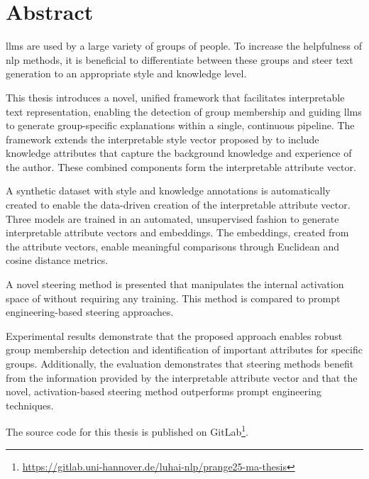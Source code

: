 %
\chapter*{Abstract}%
\label{sec:abstract}
\vspace*{-10mm}

\Acp{llm} are used by a large variety of groups of people. To increase the helpfulness of \ac{nlp} methods, it is beneficial to differentiate between these groups and steer text generation to an appropriate style and knowledge level.

This thesis introduces a novel, unified framework that facilitates interpretable text representation, enabling the detection of group membership and guiding \acp{llm} to generate group-specific explanations within a single, continuous pipeline. The framework extends the interpretable style vector proposed by \citet{patelLearningInterpretableStyle2023} to include knowledge attributes that capture the background knowledge and experience of the author. These combined components form the interpretable attribute vector.

A synthetic dataset with style and knowledge annotations is automatically created to enable the data-driven creation of the interpretable attribute vector. Three models are trained in an automated, unsupervised fashion to generate interpretable attribute vectors and embeddings. The embeddings, created from the attribute vectors, enable meaningful comparisons through Euclidean and cosine distance metrics.

A novel steering method is presented that manipulates the internal activation space of  without requiring any training. This method is compared to prompt engineering-based steering approaches.

Experimental results demonstrate that the proposed approach enables robust group membership detection and identification of important attributes for specific groups. Additionally, the evaluation demonstrates that steering methods benefit from the information provided by the interpretable attribute vector and that the novel, activation-based steering method outperforms prompt engineering techniques.

The source code for this thesis is published on GitLab\footnote{\url{https://gitlab.uni-hannover.de/luhai-nlp/prange25-ma-thesis}}.






